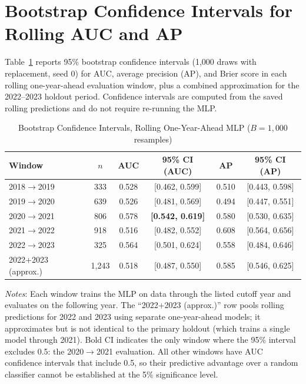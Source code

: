 \documentclass[12pt]{article}
\begin{document}
\newpage
\appendix

\section{Bootstrap Confidence Intervals for Rolling AUC and AP}
\label{app:bootstrap}

Table~\ref{tab:bootstrap} reports 95\% bootstrap confidence intervals
(1,000 draws with replacement, seed 0) for AUC, average precision (AP), and
Brier score in each rolling one-year-ahead evaluation window, plus a combined
approximation for the 2022--2023 holdout period.  Confidence intervals are
computed from the saved rolling predictions and do not require re-running
the MLP.

\begin{table}[H]
\centering
\caption{Bootstrap Confidence Intervals, Rolling One-Year-Ahead MLP
  ($B = 1{,}000$ resamples)}\label{tab:bootstrap}
\begin{threeparttable}
\small
\begin{tabular}{lccccc}
\toprule
Window & $n$ & AUC & 95\% CI (AUC) & AP & 95\% CI (AP) \\
\midrule
2018$\to$2019 & 333  & 0.528 & {[0.462, 0.599]} & 0.510 & {[0.443, 0.598]} \\
2019$\to$2020 & 639  & 0.526 & {[0.481, 0.569]} & 0.494 & {[0.447, 0.551]} \\
2020$\to$2021 & 806  & 0.578 & \textbf{[0.542, 0.619]} & 0.580 & {[0.530, 0.635]} \\
2021$\to$2022 & 918  & 0.516 & {[0.482, 0.552]} & 0.608 & {[0.564, 0.656]} \\
2022$\to$2023 & 325  & 0.564 & {[0.501, 0.624]} & 0.558 & {[0.484, 0.646]} \\
\midrule
2022+2023 (approx.) & 1,243 & 0.518 & {[0.487, 0.550]} & 0.585 & {[0.546, 0.625]} \\
\bottomrule
\end{tabular}
\begin{tablenotes}
  \small
  \item \textit{Notes}: Each window trains the MLP on data through the
  listed cutoff year and evaluates on the following year.  The
  ``2022+2023 (approx.)'' row pools rolling predictions for 2022 and 2023
  using separate one-year-ahead models; it approximates but is not identical
  to the primary holdout (which trains a single model through 2021).  Bold
  CI indicates the only window where the 95\% interval excludes 0.5: the
  2020$\to$2021 evaluation.  All other windows have AUC confidence intervals
  that include 0.5, so their predictive advantage over a random classifier
  cannot be established at the 5\% significance level.
\end{tablenotes}
\end{threeparttable}
\end{table}
\end{document}
